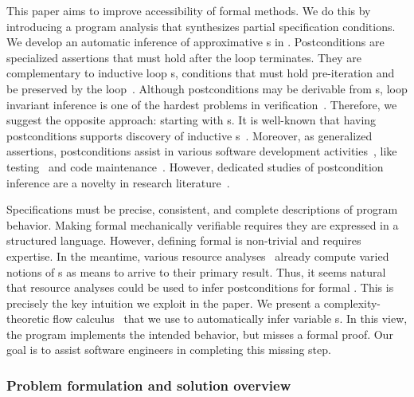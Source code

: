 This paper aims to improve accessibility of formal methods. We do this by
introducing a program analysis that synthesizes partial specification
conditions. We develop an automatic inference of approximative
s in . Postconditions are specialized
assertions that must hold after the loop terminates. They are complementary to
inductive loop
s, \ie conditions that must hold pre-iteration and be preserved
by the loop~\cite{sankaranarayanan2004}. Although postconditions may be
derivable from s, loop invariant
inference is one of the hardest problems in
verification~\cite{dillig2013,si2018}. Therefore, we suggest the opposite
approach: starting with s. It is well-known that having
postconditions supports discovery of inductive
s~\cite{furia2010}. Moreover, as
generalized assertions, postconditions assist in various software development
activities~\cite{nguyen2022}, like testing~\cite{alagarsamy2024,zhang2015} and
code maintenance~\cite{rosenblum1995}. However, dedicated studies of
postcondition inference are a novelty in research
literature~\cite{popeea2006,molina2021}.

Specifications must be precise, consistent, and complete
descriptions of program behavior. Making formal 
mechanically verifiable requires they are expressed in a structured language.
However, defining formal  is non-trivial and requires
expertise. In the meantime, various resource
analyses~\cite{jones2009,brockschmidt2016} already
compute varied notions of s as means to arrive to their
primary result. Thus, it seems natural that {resource analyses could be used to
infer postconditions} for formal . This is precisely the key
intuition we exploit in the paper. We present a complexity\hyp{}theoretic flow
calculus~\cite{jones2009,aubert20222} that we use to
automatically infer variable s. In this view, the program
implements the intended behavior, but misses a formal proof. Our goal is to
assist software engineers in completing this missing step.

\subsubsection{Problem formulation and solution overview}
\label{subsec:overview}

